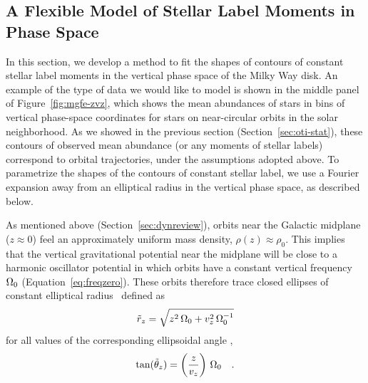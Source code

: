 
\subsection{A Flexible Model of Stellar Label Moments in Phase Space}
\label{sec:oti-fourier}

In this section, we develop a method to fit the shapes of contours of constant stellar
label moments in the vertical phase space of the Milky Way disk.
An example of the type of data we would like to model is shown in the middle panel of
Figure~\ref{fig:mgfe-zvz}, which shows the mean  abundances of stars in
bins of vertical phase-space coordinates for stars on near-circular orbits in the solar
neighborhood.
As we showed in the previous section (Section~\ref{sec:oti-stat}), these contours of
observed mean  abundance (or any moments of stellar labels) correspond to
orbital trajectories, under the assumptions adopted above.
To parametrize the shapes of the contours of constant stellar label, we use a Fourier
expansion away from an elliptical radius in the vertical phase space, as described
below.

As mentioned above (Section~\ref{sec:dynreview}), orbits near the Galactic midplane ($z
\approx 0$) feel an approximately uniform mass density, $\rho(z) \approx \rho_0$.
This implies that the vertical gravitational potential near the midplane will be close
to a harmonic oscillator potential in which orbits have a constant vertical frequency
$\Omega_0$ (Equation~\ref{eq:freqzero}).
These orbits therefore trace closed ellipses of constant elliptical radius \rzp\ defined
as
\begin{equation}
    \tilde{r}_z = \sqrt{z^2 \, \Omega_0 + v_z^2 \, \Omega_0^{-1}} \label{eq:rzp}
\end{equation}
for all values of the corresponding ellipsoidal angle \thzp,
\begin{equation}
    \tan (\tilde{\theta}_z) = \left(\frac{z}{v_z}\right) \, \Omega_0 \quad .
    \label{eq:thetazp}
\end{equation}

